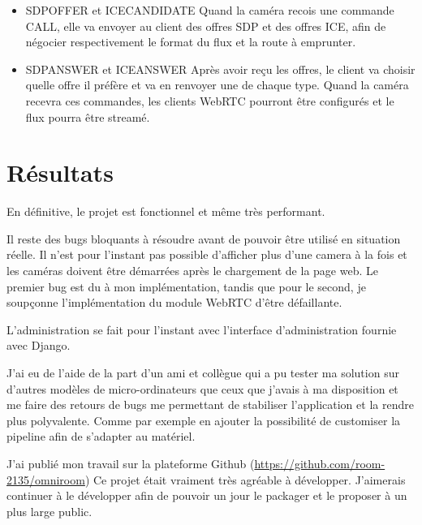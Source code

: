 \documentclass[12pt, a4paper]{report}
\begin{document}
\begin{itemize}
    \item SDP\textunderscore OFFER et ICE\textunderscore CANDIDATE\newline
        Quand la caméra recois une commande CALL, elle va envoyer au client des offres SDP et des offres ICE, afin de négocier respectivement le format du flux et la route à emprunter.\newline

    \item SDP\textunderscore ANSWER et ICE\textunderscore ANSWER\newline
        Après avoir reçu les offres, le client va choisir quelle offre il préfère et va en renvoyer une de chaque type.\newline
        Quand la caméra recevra ces commandes, les clients WebRTC pourront être configurés et le flux pourra être streamé.

\end{itemize}

\chapter{Résultats}
En définitive, le projet est fonctionnel et même très performant.\newline

Il reste des bugs bloquants à résoudre avant de pouvoir être utilisé en situation réelle.\newline
Il n'est pour l'instant pas possible d'afficher plus d'une camera à la fois et les caméras doivent être démarrées après le chargement de la page web. Le premier bug est du à mon implémentation, tandis que pour le second, je soupçonne l'implémentation du module WebRTC d'être défaillante.\newline

L'administration se fait pour l'instant avec l'interface d'administration fournie avec Django.\newline

J'ai eu de l'aide de la part d'un ami et collègue qui a pu tester ma solution sur d'autres modèles de micro-ordinateurs que ceux que j'avais à ma disposition et me faire des retours de bugs me permettant de stabiliser l'application et la rendre plus polyvalente. Comme par exemple en ajouter la possibilité de customiser la pipeline afin de s'adapter au matériel.\newline

J'ai publié mon travail sur la plateforme Github (\url{https://github.com/room-2135/omniroom})
Ce projet était vraiment très agréable à développer. J'aimerais continuer à le développer afin de pouvoir un jour le packager et le proposer à un plus large public.\newline
\end{document}
